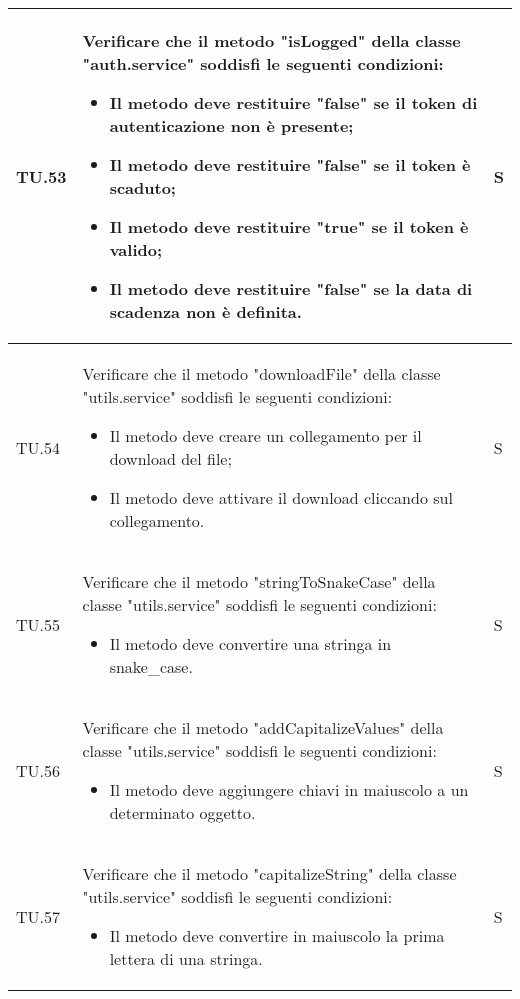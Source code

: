 \begin{adjustwidth}{-0.5cm}{-0.5cm}
\begin{longtable}{|P{1.5cm}|>{\raggedright}P{9.5cm}|>{\arraybackslash}P{1.5cm}|}
		\hline TU.53 & Verificare che il metodo "isLogged" della classe "auth.service" soddisfi le seguenti condizioni:
		\begin{itemize}
			\item Il metodo deve restituire "false" se il token di autenticazione non è presente;
			\item Il metodo deve restituire "false" se il token è scaduto;
			\item Il metodo deve restituire "true" se il token è valido;
			\item Il metodo deve restituire "false" se la data di scadenza non è definita.
    \end{itemize} & S \\

		\hline TU.54 & Verificare che il metodo "downloadFile" della classe "utils.service" soddisfi le seguenti condizioni:
		\begin{itemize}
			\item Il metodo deve creare un collegamento per il download del file;
			\item Il metodo deve attivare il download cliccando sul collegamento.
    \end{itemize} & S \\

		\hline TU.55 & Verificare che il metodo "stringToSnakeCase" della classe "utils.service" soddisfi le seguenti condizioni:
		\begin{itemize}
			\item Il metodo deve convertire una stringa in snake\_case.
    \end{itemize} & S \\

		\hline TU.56 & Verificare che il metodo "addCapitalizeValues" della classe "utils.service" soddisfi le seguenti condizioni:
		\begin{itemize}
			\item Il metodo deve aggiungere chiavi in maiuscolo a un determinato oggetto.
    \end{itemize} & S \\

		\hline TU.57 & Verificare che il metodo "capitalizeString" della classe "utils.service" soddisfi le seguenti condizioni:
		\begin{itemize}
			\item Il metodo deve convertire in maiuscolo la prima lettera di una stringa.
    \end{itemize} & S \\
	\end{longtable}
\end{adjustwidth}
\egroup

